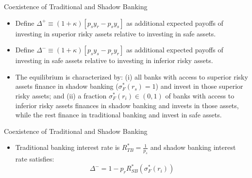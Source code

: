\documentclass[
  ignorenonframetext,
]{beamer}
\providecommand{\tightlist}{%
  \setlength{\itemsep}{0pt}\setlength{\parskip}{0pt}}
\begin{document}
\begin{frame}{Coexistence of Traditional and Shadow Banking}
\protect\hypertarget{coexistence-of-traditional-and-shadow-banking}{}

\begin{itemize}
\item
  Define \(\Delta^+\equiv(1+\kappa)[p_{s}y_{r}-p_{s}y_{s}]\) as
  additional expected payoffs of investing in superior risky assets
  relative to investing in safe assets.
\item
  Define \(\Delta^-\equiv(1+\kappa)[p_{s}y_{s}-p_{r}y_{r}]\) as
  additional expected payoffs of investing in safe assets relative to
  investing in inferior risky assets.
\item
  The equilibrium is characterized by: (i) all banks with access to
  superior risky assets finance in shadow banking
  (\(\sigma^*_{F}(r_{s})=1\)) and invest in those superior risky assets;
  and (ii) a fraction \(\sigma^*_{F}(r_{i})\in(0,1)\) of banks with
  access to inferior risky assets finances in shadow banking and invests
  in those assets, while the rest finance in traditional banking and
  invest in safe assets.
\end{itemize}

\end{frame}

\begin{frame}{Coexistence of Traditional and Shadow Banking}
\protect\hypertarget{coexistence-of-traditional-and-shadow-banking-1}{}

\begin{itemize}
\tightlist
\item
  Traditional banking interest rate is \(R^*_{TB}=\frac{1}{p_{s}}\) and
  shadow banking interest rate satisfies: \[
  \Delta^-=1-p_{r}R^*_{SB}(\sigma^*_{F}(r_{i}))
  \]
\end{itemize}

\end{frame}
\end{document}
